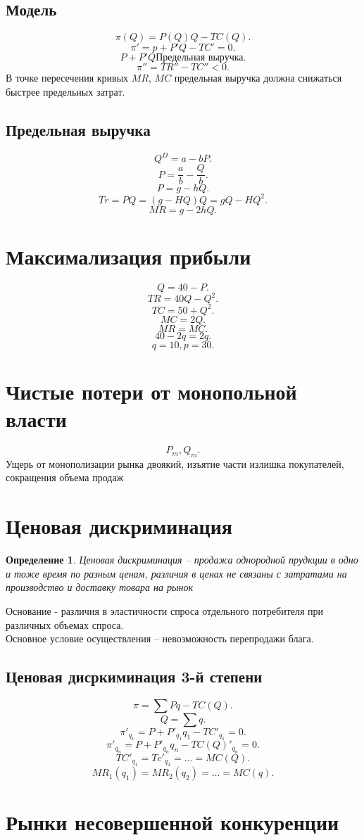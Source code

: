 \documentclass[14pt]{extarticle}
\newtheorem{definition}{Определение}
\begin{document}
\subsection{Модель}
\[
    \pi(Q) = P(Q)Q - TC(Q)
.\]
\[
\pi'  = p + P' Q - TC' = 0
.\] 
\[
    P + P' Q \text{Предельная выручка}
.\] 
\[
\pi'' = TR'' - TC'' < 0
.\] 
В точке пересечения кривых $MR$,  $MC$ предельная выручка должна снижаться быстрее предельных затрат.
\subsection{Предельная выручка}
\[
Q^{D} = a - bP
.\] 
\[
P = \frac{a}{b} - \frac{Q}{b}
.\] 
\[
P = g - h Q
.\] 
\[
Tr = PQ = (g - HQ)Q = gQ -HQ^2
.\] 
\[
MR = g - 2hQ
.\] 
\section{Максимализация прибыли}
\[
Q = 40 - P
.\] 
\[
TR = 40Q - Q^2
.\] 
\[
TC = 50 + Q^2
.\] 
\[
MC = 2Q
.\] 
\[
MR = MC
.\] 
\[
40 - 2q = 2q
.\] 
\[
q = 10, p =30
.\] 
\section{Чистые потери от монопольной власти}
\[
P_{m}, Q_{m}
.\] 
Ущерь от монополизации рынка двоякий, изъятие части излишка покупателей, сокращения объема продаж
\section{Ценовая дискриминация}
\begin{definition}
    Ценовая дискриминация -- продажа однородной прудкции в одно и тоже время по разным ценам, различия в ценах не связаны с затратами на производство и доставку товара на рынок
\end{definition}
Основание -  различия в эластичности спроса отдельного потребителя при различных объемах спроса.\\
Основное условие осуществления -- невозможность перепродажи блага.
\subsection{Ценовая дисркиминация 3-й степени}
\[
\pi = \sum Pq  - TC(Q)
.\] 
\[
Q = \sum q
.\] 
\[
\pi'_{q_1} = P  + P'_{q_1} q_1 - TC'_{q_1} = 0
.\] 
\[
\pi'_{q_{n}} = P + P'_{q_{n}} q_{n} - TC(Q)'_{q_{n}} = 0
.\] 
\[
TC'_{q_1} = Tc'_{q_2} = \dots =  MC(Q)
.\] 
\[
MR_1(q_1) = MR_2(q_2) = \dots = MC(q)
.\] 
\section{Рынки несовершенной конкуренции}
\end{document}
